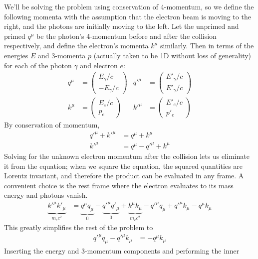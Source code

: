 We'll be solving the problem using conservation of 4-momentum, so we define
the following momenta with the assumption that the electron beam is moving
to the right, and the photons are initially moving to the left. Let the
unprimed and primed $q^{\mu}$ be the photon's 4-momentum before and after the
collision respectively, and define the electron's momenta $k^{\mu}$ similarly.
Then in terms of the energies $E$ and 3-momenta $p$ (actually taken to be 1D
without loss of generality) for each of the photon $\gamma $ and electron $e$:
\begin{align*}
    q^{\mu} &= \begin{pmatrix} E_\gamma /c \\ -E_\gamma /c \end{pmatrix} &
	q'^{\mu} &= \begin{pmatrix} E'_\gamma /c \\ E'_\gamma /c \end{pmatrix}
    \\
    k^{\mu} &= \begin{pmatrix} E_e/c \\ p_e \end{pmatrix} &
	k'^{\mu} &= \begin{pmatrix} E'_e/c \\ p'_e \end{pmatrix}    
\end{align*}
By conservation of momentum,
\begin{align*}
    q'^{\mu} + k'^{\mu} &= q^{\mu} + k^{\mu} \\
    k'^{\mu} &= q^{\mu} - q'^{\mu} + k^{\mu}
\end{align*}
Solving for the unknown electron momentum after the collision lets us eliminate
it from the equation; when we square the equation, the squared quantities are
Lorentz invariant, and therefore the product can be evaluated in any frame. A
convenient choice is the rest frame where the electron evaluates to its mass
energy and photons vanish.
\begin{align*}
    \underbrace{k'^{\mu} k'_{\mu}}_{m_e c^2} &=
	\underbrace{q^{\mu} q_{\mu}}_{0}
	- \underbrace{q'^{\mu} q'_{\mu}}_{0}
	+ \underbrace{k^{\mu} k_{\mu}}_{m_e c^2}
	- q'^{\mu} q_{\mu} + q'^{\mu} k_{\mu} - q^{\mu} k_{\mu}
\end{align*}
This greatly simplifies the rest of the problem to
\begin{align*}
    q'^{\mu} q_{\mu} - q'^{\mu} k_{\mu} &= - q^{\mu} k_{\mu}
\end{align*}
Inserting the energy and 3-momentum components and performing the inner
